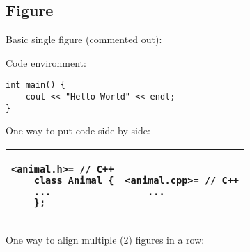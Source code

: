 \documentclass[12pt]{article}
\begin{document}
        \subsection{Figure}
        \label{sec:figures}
            Basic single figure (commented out):

            Code environment:
\begin{lstlisting}[stepnumber=0]
int main() {
    cout << "Hello World" << endl;
}
\end{lstlisting}

            One way to put code side-by-side:

\begin{tabular}{l|l}
\hline
\begin{minipage}[h]{0.5\textwidth}
    \begin{lstlisting}[stepnumber=0]
    <animal.h>= // C++
    class Animal {
    ...
    };
    \end{lstlisting}
\end{minipage}
&                  %
\begin{minipage}[h]{0.5\textwidth}
    \begin{lstlisting}[stepnumber=0]
    <animal.cpp>= // C++
    ...
    \end{lstlisting}
\end{minipage} \\ %
\hline
\end{tabular}

                One way to align multiple (2) figures in a row:
\end{document}
